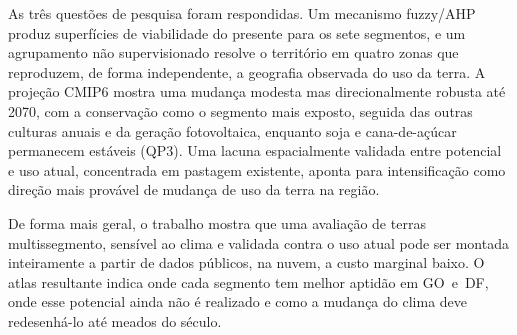 As três questões de pesquisa foram respondidas. Um mecanismo fuzzy/AHP produz superfícies de
viabilidade do presente para os sete segmentos, e um agrupamento não supervisionado resolve o
território em quatro zonas que reproduzem, de forma independente, a geografia observada do uso da
terra. A projeção CMIP6 mostra uma mudança modesta mas direcionalmente robusta até 2070, com a
conservação como o segmento mais exposto, seguida das outras culturas anuais e da geração
fotovoltaica, enquanto soja e cana-de-açúcar permanecem estáveis (QP3). Uma lacuna espacialmente
validada entre potencial e uso atual, concentrada em pastagem existente, aponta para
intensificação como direção mais provável de mudança de uso da terra na região.

De forma mais geral, o trabalho mostra que uma avaliação de terras multissegmento, sensível ao
clima e validada contra o uso atual pode ser montada inteiramente a partir de dados públicos, na
nuvem, a custo marginal baixo. O atlas resultante indica onde cada segmento tem melhor aptidão em
GO~e~DF, onde esse potencial ainda não é realizado e como a mudança do clima deve redesenhá-lo até
meados do século.
